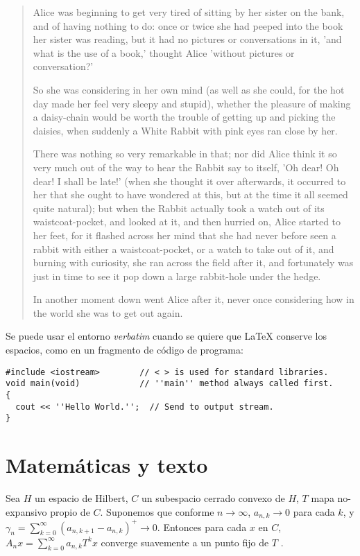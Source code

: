 \documentclass[11pt,spanish]{report}
\begin{document}
\begin{quotation}
Alice was beginning to get very tired of sitting by her sister on the bank,
and of having nothing to do: once or twice she had peeped into the book her
sister was reading, but it had no pictures or conversations in it, 'and what
is the use of a book,' thought Alice 'without pictures or conversation?'

So she was considering in her own mind (as well as she could, for the hot day
made her feel very sleepy and stupid), whether the pleasure of making a
daisy-chain would be worth the trouble of getting up and picking the daisies,
when suddenly a White Rabbit with pink eyes ran close by her.

There was nothing so very remarkable in that; nor did Alice think it so very
much out of the way to hear the Rabbit say to itself, 'Oh dear! Oh dear! I
shall be late!' (when she thought it over afterwards, it occurred to her that
she ought to have wondered at this, but at the time it all seemed quite
natural); but when the Rabbit actually took a watch out of its
waistcoat-pocket, and looked at it, and then hurried on, Alice started to her
feet, for it flashed across her mind that she had never before seen a rabbit
with either a waistcoat-pocket, or a watch to take out of it, and burning with
curiosity, she ran across the field after it, and fortunately was just in time
to see it pop down a large rabbit-hole under the hedge.

In another moment down went Alice after it, never once considering how in the
world she was to get out again.
\end{quotation}

Se puede usar el entorno \emph{verbatim} cuando se quiere que \LaTeX {} conserve los espacios, como en un fragmento de código de programa:

\begin{verbatim}
#include <iostream>        // < > is used for standard libraries.
void main(void)            // ''main'' method always called first.
{
  cout << ''Hello World.'';  // Send to output stream.
}
\end{verbatim}

\section{Matemáticas y texto}

Sea $H$ un espacio de Hilbert, $C$ un subespacio cerrado convexo de $H$, $T$
mapa no-expansivo propio de $C$. Suponemos que conforme $n\rightarrow\infty$,
$a_{n,k}\rightarrow0$ para cada $k$, y $\gamma_{n}=\sum_{k=0}^{\infty}\left(
a_{n,k+1}-a_{n,k}\right)  ^{+}\rightarrow0.$ Entonces para cada $x$ en $C$,
$A_{n}x=\sum_{k=0}^{\infty}a_{n,k}T^{k}x$ converge suavemente a un punto fijo de $T$ .
\end{document}
